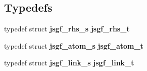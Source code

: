 \subsection*{\-Typedefs}
\begin{DoxyCompactItemize}
\item 
typedef struct {\bf jsgf\-\_\-rhs\-\_\-s} {\bfseries jsgf\-\_\-rhs\-\_\-t}\label{jsgf__internal_8h_ad8fc00ae94c7a558005de3e89c35142f}

\item 
typedef struct {\bf jsgf\-\_\-atom\-\_\-s} {\bfseries jsgf\-\_\-atom\-\_\-t}\label{jsgf__internal_8h_a439a04913bdb6a58d86ad152b952f0ee}

\item 
typedef struct {\bf jsgf\-\_\-link\-\_\-s} {\bfseries jsgf\-\_\-link\-\_\-t}\label{jsgf__internal_8h_a5b84ef71c936d856751f19992a7245eb}

\end{DoxyCompactItemize}
